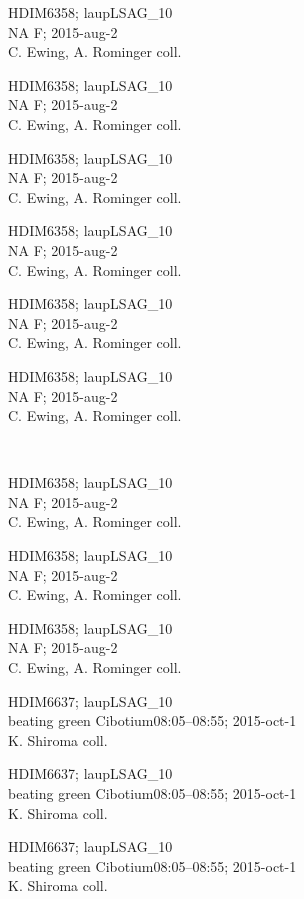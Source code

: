 \documentclass[2pt]{extarticle}
\begin{document}
\noindent
\parbox{0.16\textwidth}{\tiny \raggedright \rule[-0.3\baselineskip]{0pt}{10pt}HDIM6358; laupLSAG\_10\\ NA F; 2015-aug-2\\ C. Ewing, A. Rominger coll.}
\parbox{0.16\textwidth}{\tiny \raggedright \rule[-0.3\baselineskip]{0pt}{10pt}HDIM6358; laupLSAG\_10\\ NA F; 2015-aug-2\\ C. Ewing, A. Rominger coll.}
\parbox{0.16\textwidth}{\tiny \raggedright \rule[-0.3\baselineskip]{0pt}{10pt}HDIM6358; laupLSAG\_10\\ NA F; 2015-aug-2\\ C. Ewing, A. Rominger coll.}
\parbox{0.16\textwidth}{\tiny \raggedright \rule[-0.3\baselineskip]{0pt}{10pt}HDIM6358; laupLSAG\_10\\ NA F; 2015-aug-2\\ C. Ewing, A. Rominger coll.}
\parbox{0.16\textwidth}{\tiny \raggedright \rule[-0.3\baselineskip]{0pt}{10pt}HDIM6358; laupLSAG\_10\\ NA F; 2015-aug-2\\ C. Ewing, A. Rominger coll.}
\parbox{0.16\textwidth}{\tiny \raggedright \rule[-0.3\baselineskip]{0pt}{10pt}HDIM6358; laupLSAG\_10\\ NA F; 2015-aug-2\\ C. Ewing, A. Rominger coll.} \\ 
\vspace{0.001in} 

\noindent
\parbox{0.16\textwidth}{\tiny \raggedright \rule[-0.3\baselineskip]{0pt}{10pt}HDIM6358; laupLSAG\_10\\ NA F; 2015-aug-2\\ C. Ewing, A. Rominger coll.}
\parbox{0.16\textwidth}{\tiny \raggedright \rule[-0.3\baselineskip]{0pt}{10pt}HDIM6358; laupLSAG\_10\\ NA F; 2015-aug-2\\ C. Ewing, A. Rominger coll.}
\parbox{0.16\textwidth}{\tiny \raggedright \rule[-0.3\baselineskip]{0pt}{10pt}HDIM6358; laupLSAG\_10\\ NA F; 2015-aug-2\\ C. Ewing, A. Rominger coll.}
\parbox{0.16\textwidth}{\tiny \raggedright \rule[-0.3\baselineskip]{0pt}{10pt}HDIM6637; laupLSAG\_10\\ beating green Cibotium08:05--08:55; 2015-oct-1\\ K. Shiroma coll.}
\parbox{0.16\textwidth}{\tiny \raggedright \rule[-0.3\baselineskip]{0pt}{10pt}HDIM6637; laupLSAG\_10\\ beating green Cibotium08:05--08:55; 2015-oct-1\\ K. Shiroma coll.}
\parbox{0.16\textwidth}{\tiny \raggedright \rule[-0.3\baselineskip]{0pt}{10pt}HDIM6637; laupLSAG\_10\\ beating green Cibotium08:05--08:55; 2015-oct-1\\ K. Shiroma coll.} \\ 
\vspace{0.001in} 
\end{document}
